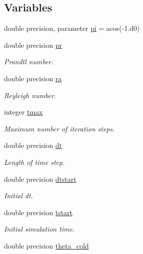 \subsection*{Variables}
\begin{DoxyCompactItemize}
\item 
double precision, parameter \mbox{\hyperlink{namespacemodule__global_a66e6463e364229164be93ec6fd01a19e}{pi}} = acos(-\/1.d0)
\item 
double precision \mbox{\hyperlink{namespacemodule__global_a86b749c501ce7838e1a47aef3b963ddc}{pr}}
\begin{DoxyCompactList}\small\item\em Prandtl number. \end{DoxyCompactList}\item 
double precision \mbox{\hyperlink{namespacemodule__global_a7256706b4dc44ce0154f5dec61873a45}{ra}}
\begin{DoxyCompactList}\small\item\em Reyleigh number. \end{DoxyCompactList}\item 
integer \mbox{\hyperlink{namespacemodule__global_aa2a5d817a73795a7801b3cccd372e9aa}{tmax}}
\begin{DoxyCompactList}\small\item\em Maximum number of iteration steps. \end{DoxyCompactList}\item 
double precision \mbox{\hyperlink{namespacemodule__global_a7cd76bf7034f9b1c715f62694cc27471}{dt}}
\begin{DoxyCompactList}\small\item\em Length of time step. \end{DoxyCompactList}\item 
double precision \mbox{\hyperlink{namespacemodule__global_a5d6f695d6a4af07b0334c3b4e609a527}{dtstart}}
\begin{DoxyCompactList}\small\item\em Initial dt. \end{DoxyCompactList}\item 
double precision \mbox{\hyperlink{namespacemodule__global_a9adeb19eb4726dcc57576c2dbc89297b}{tstart}}
\begin{DoxyCompactList}\small\item\em Initial simulation time. \end{DoxyCompactList}\item 
double precision \mbox{\hyperlink{namespacemodule__global_abbd64b6182b14d2608b25bb750492f9c}{theta\+\_\+cold}}

\end{DoxyCompactItemize}
